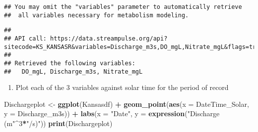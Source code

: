 \documentclass[]{article}
\newenvironment{Shaded}{\begin{snugshade}}{\end{snugshade}}
\newcommand{\DataTypeTok}[1]{\textcolor[rgb]{0.13,0.29,0.53}{#1}}
\newcommand{\DecValTok}[1]{\textcolor[rgb]{0.00,0.00,0.81}{#1}}
\newcommand{\KeywordTok}[1]{\textcolor[rgb]{0.13,0.29,0.53}{\textbf{#1}}}
\newcommand{\NormalTok}[1]{#1}
\newcommand{\OperatorTok}[1]{\textcolor[rgb]{0.81,0.36,0.00}{\textbf{#1}}}
\newcommand{\StringTok}[1]{\textcolor[rgb]{0.31,0.60,0.02}{#1}}
\providecommand{\tightlist}{%
  \setlength{\itemsep}{0pt}\setlength{\parskip}{0pt}}
\begin{document}
\begin{verbatim}
## You may omit the "variables" parameter to automatically retrieve
##  all variables necessary for metabolism modeling.
\end{verbatim}

\begin{verbatim}
## 
## API call: https://data.streampulse.org/api?sitecode=KS_KANSASR&variables=Discharge_m3s,DO_mgL,Nitrate_mgL&flags=true
## 
## Retrieved the following variables:
##   DO_mgL, Discharge_m3s, Nitrate_mgL
\end{verbatim}

\begin{Shaded}
\end{Shaded}

\begin{enumerate}
\def\labelenumi{\arabic{enumi}.}
\setcounter{enumi}{5}
\tightlist
\item
  Plot each of the 3 variables against solar time for the period of
  record
\end{enumerate}

\begin{Shaded}
\begin{Highlighting}[]
\NormalTok{Dischargeplot <-}\StringTok{ }\KeywordTok{ggplot}\NormalTok{(Kansasdf) }\OperatorTok{+}
\StringTok{  }\KeywordTok{geom_point}\NormalTok{(}\KeywordTok{aes}\NormalTok{(}\DataTypeTok{x =}\NormalTok{ DateTime_Solar, }\DataTypeTok{y =}\NormalTok{ Discharge_m3s)) }\OperatorTok{+}
\StringTok{  }\KeywordTok{labs}\NormalTok{(}\DataTypeTok{x =} \StringTok{"Date"}\NormalTok{, }\DataTypeTok{y =} \KeywordTok{expression}\NormalTok{(}\StringTok{"Discharge (m"}\OperatorTok{^}\DecValTok{3}\OperatorTok{*}\StringTok{"/s)"}\NormalTok{))}
\KeywordTok{print}\NormalTok{(Dischargeplot)}
\end{Highlighting}
\end{Shaded}
\end{document}
